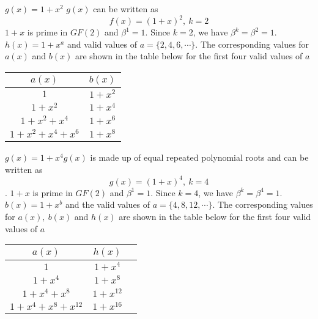 \begin{example}
$g(x)=1+x^2$\newline
$g(x)$ can be written as $$f(x)=(1+x)^2,~k=2$$ $1+x$ is prime in $GF(2)$ and $\beta^{1}=1$. Since $k=2$, we have $\beta^{k}=\beta^{2}=1$. $h(x)=1+x^a$ and valid values of $a=\{2,4,6,\cdots \}$.
The corresponding values for $a(x)$ and $b(x)$ are shown in the table below for the first four valid values of $a$

 \begin{table*}[h]
 \caption{$f(x)=1+x^2$}
 \centering
\begin{tabular}{c c } 
\hline
 $a(x)$ & $b(x)$ \\ [0.5ex] 
 \hline\hline
$1$ & $1+x^2$\\ 
$1+x^2$ & $1+x^4$ \\
$1+x^2+x^4$ & $1+x^6$\\
$1+x^2+x^4+x^6$ & $1+x^8$ 
\end{tabular}
 \label{novelTab1}
\end{table*}
\end{example}

\begin{example}
$g(x)=1+x^4$\newline $g(x)$ is made up of equal repeated polynomial roots and can be written as $$g(x)=(1+x)^4,~k=4$$. $1+x$ is prime in $GF(2)$ and $\beta^{1}=1$. Since $k=4$, we have $\beta^{k}=\beta^{4}=1$. $b(x)=1+x^b$ and the valid values of $a=\{4,8,12,\cdots \}$.
The corresponding values for $a(x),~b(x)$ and $h(x)$ are shown in the table below for the first four valid values of $a$

\begin{table*}[h]
\caption{$g(x)=1+x^4$}
\centering
 \begin{tabular}{c c c} 
 \hline
$a(x)$ & $h(x)$ \\ [0.5ex] 
\hline\hline
$1$ &  $1+x^4$\\ 
$1+x^4$ & $1+x^8$ \\
$1+x^4+x^8$ & $1+x^{12}$ \\
$1+x^4+x^8+x^{12}$ & $1+x^{16}$ 
\end{tabular}
\label{novelTab4}
\end{table*}
\end{example}

